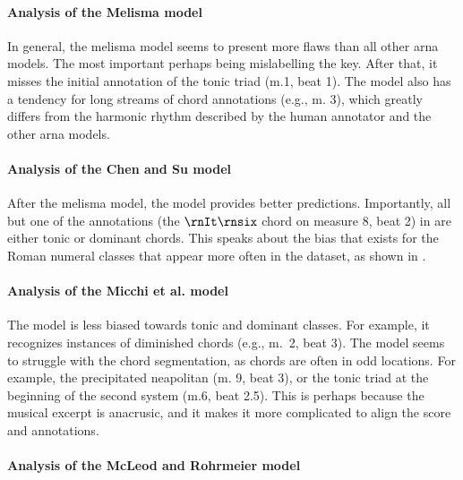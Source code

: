 \paragraph{Analysis of the Melisma model}

In general, the \gls{melisma} model seems to present more
flaws than all other \gls{arna} models. The most important
perhaps being mislabelling the key. After that, it misses
the initial annotation of the tonic triad (m.1, beat 1). The
model also has a tendency for long streams of chord
annotations (e.g., m. 3), which greatly differs from the
harmonic rhythm described by the human annotator and the
other \gls{arna} models. 

\paragraph{Analysis of the Chen and Su model}

After the \gls{melisma} model, the \textcite{chen2021attend}
model provides better predictions. Importantly, all but one
of the annotations (the $\rnIt\rnsix$ chord on measure 8,
beat 2) in \textcite{chen2021attend} are either tonic or
dominant chords. This speaks about the bias that exists for
the Roman numeral classes that appear more often in the
dataset, as shown in . 

\paragraph{Analysis of the Micchi et al. model}

The \textcite{micchi2021deep} model is less biased towards
tonic and dominant classes. For example, it recognizes
instances of diminished chords (e.g., m.~2, beat 3). The
model seems to struggle with the chord segmentation, as
chords are often in odd locations. For example, the
precipitated \gls{neapolitan} (m. 9, beat 3), or the tonic
triad at the beginning of the second system (m.6, beat 2.5).
This is perhaps because the musical excerpt is anacrusic,
and it makes it more complicated to align the score and
annotations. 

\paragraph{Analysis of the McLeod and Rohrmeier model}

